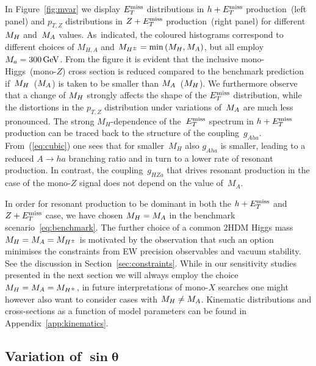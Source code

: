 In Figure~\ref{fig:mvar} we display $E_T^\mathrm{miss}$ distributions in $h + E_T^\mathrm{miss}$ production~(left panel) and $p_{T,Z}$ distributions in $Z+E_T^\mathrm{miss}$ production~(right panel) for different~$M_{H}$ and~$M_{A}$ values. As~indicated, the coloured histograms correspond to  different choices of $M_{H,A}$ and $M_{H^{\pm}} = {\rm min} \left ( M_{H}, M_{A} \right )$, but all employ $M_a = 300 \, {\rm GeV}$. From the figure it is evident that the inclusive mono-Higgs~(mono-$Z$) cross section is reduced compared to the benchmark prediction if~$M_{H}$~($M_{A}$) is taken to be smaller than $M_{A}$~($M_{H}$). 
We furthermore observe that  a change of $M_{H}$ strongly affects the shape of the $E_T^\mathrm{miss}$ distribution, while the distortions in the $p_{T,Z}$ distribution under variations of~$M_{A}$ are much less pronounced. The strong $M_H$-dependence of the~$E_T^\mathrm{miss}$ spectrum in $h + E_T^\mathrm{miss}$ production can be traced back to the structure of the coupling~$g_{Aha}$. From~(\ref{eq:cubic}) one sees that for smaller~$M_H$ also $g_{Aha}$ is smaller, leading to a reduced $A \to ha$ branching ratio  and in turn to a lower rate of resonant production. In contrast, the coupling~$g_{HZa}$ that drives resonant production in the case of the mono-$Z$ signal does not depend on the value of~$M_A$. 

In order for resonant production to be dominant in both the $h + E_T^\mathrm{miss}$ and $Z + E_T^\mathrm{miss}$ case, we have chosen $M_{H} = M_{A}$ in the benchmark scenario~\eqref{eq:benchmark}. The further choice of a common 2HDM Higgs mass $M_{H} = M_{A} = M_{H^{\pm}}$ is motivated by the observation that such an option minimises the constraints from EW precision observables and vacuum stability. See the discussion in Section~\ref{sec:constraints}. While in our sensitivity studies presented in the next section we will always employ the choice $M_{H} = M_{A} = M_{H^{\pm}}$, in future \hdma  interpretations of mono-$X$ searches one might however  also want to consider cases with $M_{H} \neq M_{A}$. Kinematic distributions and cross-sections as a function of model parameters can be found in Appendix~\ref{app:kinematics}. 

\subsection*{Variation of $\bm{\sin \theta}$}

